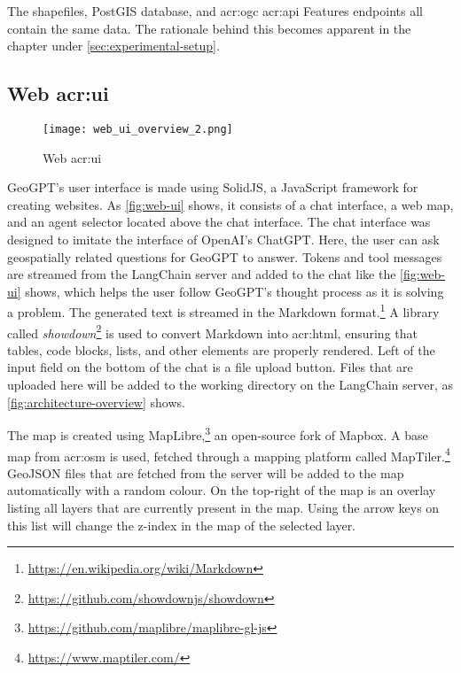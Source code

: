 The shapefiles, PostGIS database, and \acrshort{acr:ogc} \acrshort{acr:api} Features endpoints all contain the same data. The rationale behind this becomes apparent in the  chapter under \autoref{sec:experimental-setup}.

\subsection[Web UI]{Web \acrshort{acr:ui}}
\label{subsec:web-ui}

\begin{figure}[h]
    \centering
    \texttt{[image: web\_ui\_overview\_2.png]}
    \caption{Web \acrshort{acr:ui}}
    \label{fig:web-ui}
\end{figure}

GeoGPT's user interface is made using SolidJS, a JavaScript framework for creating websites. As \autoref{fig:web-ui} shows, it consists of a chat interface, a web map, and an agent selector located above the chat interface. The chat interface was designed to imitate the interface of OpenAI's ChatGPT. Here, the user can ask geospatially related questions for GeoGPT to answer. Tokens and tool messages are streamed from the LangChain server and added to the chat like the \autoref{fig:web-ui} shows, which helps the user follow GeoGPT's thought process as it is solving a problem. The generated text is streamed in the Markdown format.\footnote{\url{https://en.wikipedia.org/wiki/Markdown}} A library called \textit{showdown}\footnote{\url{https://github.com/showdownjs/showdown}} is used to convert Markdown into \acrshort{acr:html}, ensuring that tables, code blocks, lists, and other elements are properly rendered. Left of the input field on the bottom of the chat is a file upload button. Files that are uploaded here will be added to the working directory on the LangChain server, as \autoref{fig:architecture-overview} shows.

The map is created using MapLibre,\footnote{\url{https://github.com/maplibre/maplibre-gl-js}} an open-source fork of Mapbox. A base map from \gls{acr:osm} is used, fetched through a mapping platform called MapTiler.\footnote{\url{https://www.maptiler.com/}} GeoJSON files that are fetched from the server will be added to the map automatically with a random colour. On the top-right of the map is an overlay listing all layers that are currently present in the map. Using the arrow keys on this list will change the z-index in the map of the selected layer.



